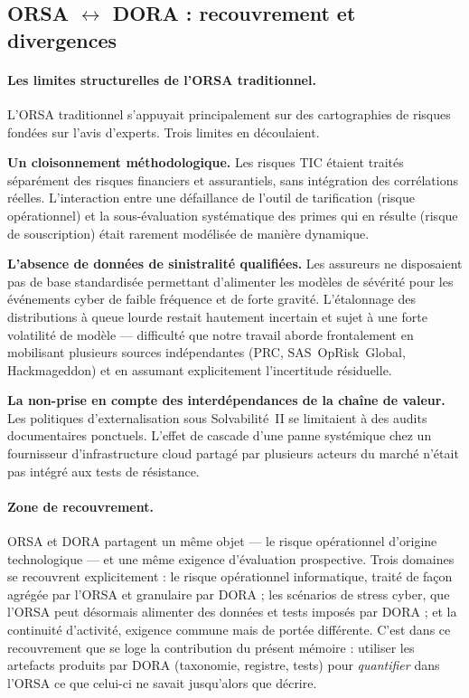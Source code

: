 \documentclass[11pt,a4paper]{article}
\theoremstyle{navystyle}
\theoremstyle{navydef}
\begin{document}
\subsection{ORSA $\leftrightarrow$ DORA : recouvrement et divergences}

\paragraph{Les limites structurelles de l'ORSA traditionnel.} L'ORSA
traditionnel s'appuyait principalement sur des cartographies de risques
fondées sur l'avis d'experts. Trois limites en découlaient.

\textbf{Un cloisonnement méthodologique.} Les risques TIC étaient traités séparément des
risques financiers et assurantiels, sans intégration des corrélations réelles.
L'interaction entre une défaillance de l'outil de tarification (risque opérationnel) et
la sous-évaluation systématique des primes qui en résulte (risque de souscription) était
rarement modélisée de manière dynamique.

\textbf{L'absence de données de sinistralité qualifiées.} Les assureurs ne disposaient
pas de base standardisée permettant d'alimenter les modèles de sévérité pour les
événements cyber de faible fréquence et de forte gravité. L'étalonnage des distributions
à queue lourde restait hautement incertain et sujet à une forte volatilité de modèle ---
difficulté que notre travail aborde frontalement en mobilisant plusieurs sources
indépendantes (PRC, SAS~OpRisk~Global, Hackmageddon) et en assumant explicitement
l'incertitude résiduelle.

\textbf{La non-prise en compte des interdépendances de la chaîne de valeur.} Les
politiques d'externalisation sous Solvabilité~II se limitaient à des audits documentaires
ponctuels. L'effet de cascade d'une panne systémique chez un fournisseur d'infrastructure
cloud partagé par plusieurs acteurs du marché n'était pas intégré aux tests de résistance.

\paragraph{Zone de recouvrement.} ORSA et DORA partagent un même objet --- le risque opérationnel d'origine technologique
--- et une même exigence d'évaluation prospective. Trois domaines se recouvrent
explicitement : le risque opérationnel informatique, traité de façon agrégée par l'ORSA
et granulaire par DORA ; les scénarios de stress cyber, que l'ORSA peut désormais alimenter
des données et tests imposés par DORA ; et la continuité d'activité, exigence commune mais
de portée différente. C'est dans ce recouvrement que se loge la contribution du présent
mémoire : utiliser les artefacts produits par DORA (taxonomie, registre, tests) pour
\emph{quantifier} dans l'ORSA ce que celui-ci ne savait jusqu'alors que décrire.
\end{document}

